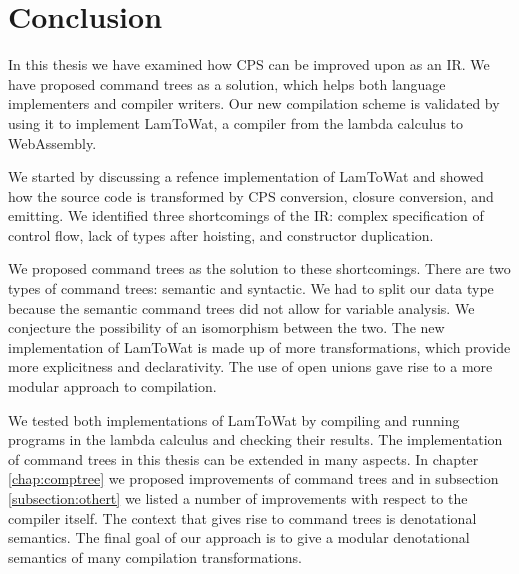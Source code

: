 \chapter{\label{chap:conclusion}Conclusion}

In this thesis we have examined how CPS can be improved upon as an IR. We have proposed command trees as a solution, which helps both language implementers and compiler writers. Our new compilation scheme is validated by using it to implement LamToWat, a compiler from the lambda calculus to WebAssembly. 

We started by discussing a refence implementation of LamToWat and showed how the source code is transformed by CPS conversion, closure conversion, and emitting. We identified three shortcomings of the IR: complex specification of control flow, lack of types after hoisting, and constructor duplication.

We proposed command trees as the solution to these shortcomings. There are two types of command trees: semantic and syntactic. We had to split our data type because the semantic command trees did not allow for variable analysis. We conjecture the possibility of an isomorphism between the two. The new implementation of LamToWat is made up of more transformations, which provide more explicitness and declarativity. The use of open unions gave rise to a more modular approach to compilation.

We tested both implementations of LamToWat by compiling and running programs in the lambda calculus and checking their results. The implementation of command trees in this thesis can be extended in many aspects. In chapter \ref{chap:comptree} we proposed improvements of command trees and in subsection \ref{subsection:othert} we listed a number of improvements with respect to the compiler itself. The context that gives rise to command trees is denotational semantics. The final goal of our approach is to give a modular denotational semantics of many compilation transformations.